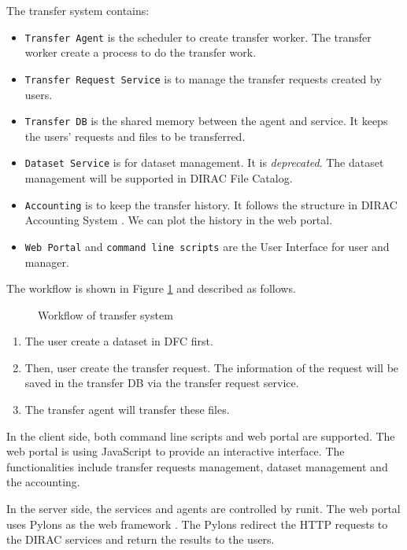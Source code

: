 The transfer system contains:

\begin{itemize}
    \item {\tt Transfer Agent} is the scheduler to create transfer worker.
          The transfer worker create a process to do the transfer work.
    \item {\tt Transfer Request Service} is to manage the transfer requests
          created by users.
    \item {\tt Transfer DB} is the shared memory between the agent and 
          service. It keeps the users' requests and files to be transferred.
    \item {\tt Dataset Service} is for dataset management. It is 
          {\em deprecated}. The dataset management will be supported in DIRAC
          File Catalog.
    \item {\tt Accounting} is to keep the transfer history.
          It follows the structure in DIRAC Accounting System
          \cite{bib:diracacct}.
          We can plot the history in the web portal.
    \item {\tt Web Portal} and {\tt command line scripts} are the 
          User Interface for user and manager.
\end{itemize}

The workflow is shown in Figure \ref{fig:workflow} and described as follows.
\begin{figure}
    
    \caption{Workflow of transfer system} \label{fig:workflow}
\end{figure}

\begin{enumerate}
\item The user create a dataset in DFC first.
\item Then, user create the transfer request.
The information of the request will be saved in the transfer DB via
the transfer request service.
\item The transfer agent will transfer these files.
\end{enumerate}

In the client side, both command line scripts and web portal are supported.
The web portal 
\cite{bib:webportal}
is using JavaScript to provide an interactive interface. The functionalities
include transfer requests management, dataset management and the 
accounting.

In the server side, the services and agents are controlled by runit.
The web portal uses Pylons as the web framework
\cite{bib:webportal}.
The Pylons redirect the HTTP requests to the DIRAC services and 
return the results to the users.
